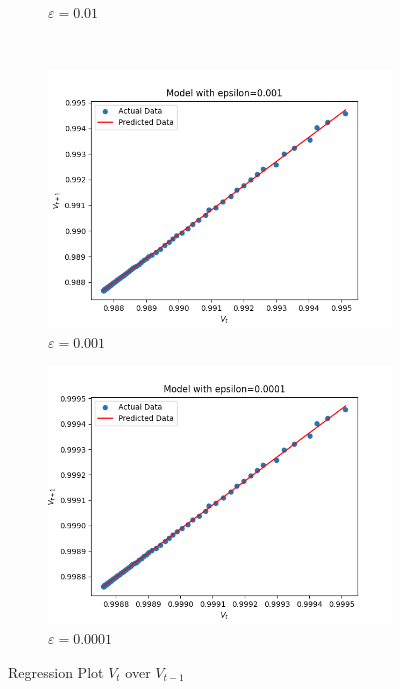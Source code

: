 \begin{figure}[h!]
\begin{subfigure}[b]{0.3\textwidth}
            \caption{$\varepsilon = 0.01$}
        \end{subfigure}\\
        \begin{subfigure}[b]{0.3\textwidth}
            \includegraphics[width=.9\linewidth]{plots/epsilon_0.001}
            \caption{$\varepsilon = 0.001$}
        \end{subfigure} \quad
        \begin{subfigure}[b]{0.3\textwidth}
            \includegraphics[width=.9\linewidth]{plots/epsilon_0.0001}
            \caption{$\varepsilon = 0.0001$}
        \end{subfigure}
        \caption{Regression Plot $V_t$ over $V_{t-1}$}
        \label{fig:vt_vs_vt1}
    \end{figure}

\newpage


